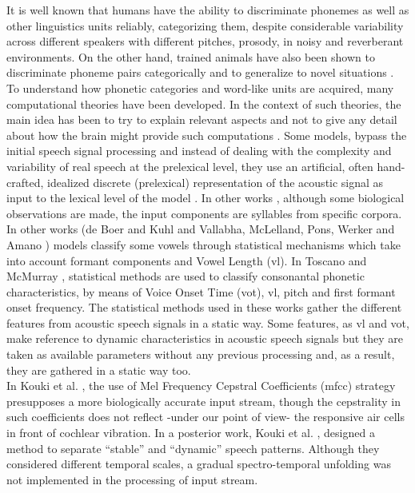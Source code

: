 \documentclass[11pt,a4paper]{article}
\begin{document}
It is well known that humans have the ability to discriminate phonemes
as well as other linguistics units reliably, categorizing them,
despite considerable variability across different speakers
with different pitches, prosody, in noisy and reverberant
environments.
On the other hand, trained animals have also been shown to discriminate phoneme
pairs categorically and to generalize to novel situations
\cite{kuhl75, kuhl83, kluender98, pons06, hienz96, dent97, lotto97}.\\

To understand how phonetic categories and word-like units
are acquired, many computational theories have been developed.
In the context of such theories, the main idea has
been to try to explain relevant aspects and
not to give any detail
about how the brain might provide such
computations \cite{rasanen12}.
Some models, bypass the initial speech signal processing and
instead of dealing with the complexity and variability of real speech
at the prelexical  level, they use an artificial, often hand-crafted, 
idealized discrete (prelexical) representation of the acoustic
signal as input to the lexical level of the model \cite{scharenborg10}.
In other works \cite{dominey00}, although some biological observations are made,
the input components are syllables from specific corpora.\\

In other works (de Boer and Kuhl \cite{boer03} and Vallabha, McLelland, Pons,
Werker and Amano \cite{vallabha07}) models classify some vowels
through statistical mechanisms which take into account formant components
and Vowel Length (\ac{vl}).
In Toscano and McMurray \cite{toscano10},
statistical methods are used to classify consonantal phonetic
characteristics, by means of Voice Onset Time (\ac{vot}),
\ac{vl}, pitch and first formant onset frequency.
The statistical methods used in these works gather the different features from
acoustic speech signals in a static way.
Some features, as \ac{vl} and \ac{vot}, make reference to
dynamic characteristics in acoustic speech signals but they are taken
as available parameters without any previous processing and, as a result,
they are gathered in a static way too.\\

In Kouki et al. \cite{kouki10},
the use of Mel Frequency Cepstral Coefficients (\ac{mfcc})
strategy presupposes a more biologically accurate input stream,
though the cepstrality in such coefficients does not reflect
-under our point of view-
the responsive air cells in front of cochlear vibration.
In a posterior work, Kouki et al. \cite{kouki11},
designed a method to separate “stable” and “dynamic” speech
patterns.
Although they considered different temporal scales,
a gradual spectro-temporal unfolding was not
implemented in the processing of input stream.\\
\end{document}

